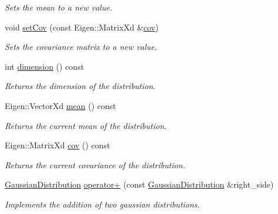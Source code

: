 \begin{DoxyCompactItemize}
\begin{DoxyCompactList}\small\item\em Sets the mean to a new value. \end{DoxyCompactList}\item 
void \hyperlink{classrefill_1_1GaussianDistribution_a48c5b06da04fef675dc044a0dabe6d86}{set\+Cov} (const Eigen\+::\+Matrix\+Xd \&\hyperlink{classrefill_1_1GaussianDistribution_a45f96d0d4d5bd8da390c54b5126e4072}{cov})
\begin{DoxyCompactList}\small\item\em Sets the covariance matrix to a new value. \end{DoxyCompactList}\item 
int \hyperlink{classrefill_1_1GaussianDistribution_a43b275170074ef7ef38d93fb4f3e1e5a}{dimension} () const 
\begin{DoxyCompactList}\small\item\em Returns the dimension of the distribution. \end{DoxyCompactList}\item 
Eigen\+::\+Vector\+Xd \hyperlink{classrefill_1_1GaussianDistribution_aa7c74dd2350c3f56877ab759cb68ba8b}{mean} () const 
\begin{DoxyCompactList}\small\item\em Returns the current mean of the distribution. \end{DoxyCompactList}\item 
Eigen\+::\+Matrix\+Xd \hyperlink{classrefill_1_1GaussianDistribution_a45f96d0d4d5bd8da390c54b5126e4072}{cov} () const 
\begin{DoxyCompactList}\small\item\em Returns the current covariance of the distribution. \end{DoxyCompactList}\item 
\hyperlink{classrefill_1_1GaussianDistribution}{Gaussian\+Distribution} \hyperlink{classrefill_1_1GaussianDistribution_aabe6056cbb9a22595e7b3b493c4f3951}{operator+} (const \hyperlink{classrefill_1_1GaussianDistribution}{Gaussian\+Distribution} \&right\+\_\+side)
\begin{DoxyCompactList}\small\item\em Implements the addition of two gaussian distributions. \end{DoxyCompactList}\end{DoxyCompactItemize}
